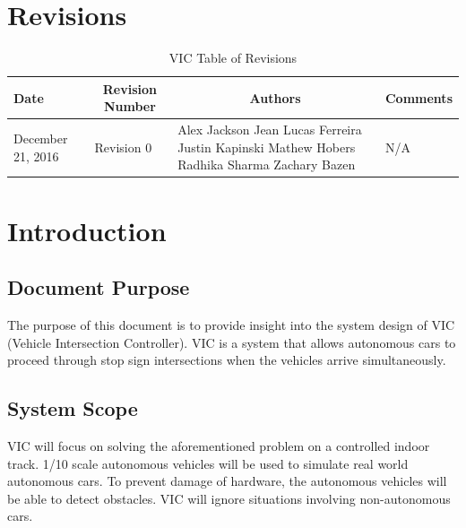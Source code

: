 \documentclass [10pt]{article}
\begin{document}
\section{Revisions}
\begin{longtable}{| p{ } | p{ } | p{ } | p{ } |} \caption{VIC Table of Revisions}  \\

\hline 
\centering \textbf{Date} & 
\multicolumn{1}{c}{\textbf {Revision Number}} &
\multicolumn{1}{|c}{\textbf {Authors}} & 
\multicolumn{1}{|c|}{\textbf {Comments}} \\ \hline

\multirow{4}{*}{\centering December 21, 2016}  & 
\multirow{4}{*}{Revision 0}& 
{Alex Jackson \newline
Jean Lucas Ferreira \newline
Justin Kapinski\newline
Mathew Hobers\newline
Radhika Sharma\newline
Zachary Bazen}
&
 \multirow{4}{*}{N/A} \\ 
\hline 


\end{longtable}
\pagebreak


\section {Introduction}

\subsection{Document Purpose}
The purpose of this document is to provide insight into the system design of VIC (Vehicle Intersection Controller). VIC is a system that allows autonomous cars to proceed through stop sign intersections when the vehicles arrive simultaneously. 

\subsection{System Scope}
VIC will focus on solving the aforementioned problem on a controlled indoor track. 1/10 scale autonomous vehicles will be used to simulate real world autonomous cars. To prevent damage of hardware, the autonomous vehicles will be able to detect obstacles. VIC will ignore situations involving non-autonomous cars. 
\end{document}
